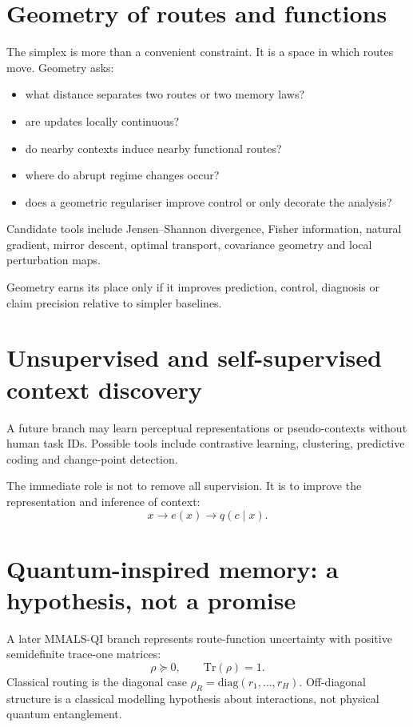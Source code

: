 \documentclass[11pt,a4paper]{article}
\begin{document}
\newpage
\section{Geometry of routes and functions}

The simplex is more than a convenient constraint. It is a space in which routes move. Geometry asks:
\begin{itemize}[leftmargin=1.4em]
\item what distance separates two routes or two memory laws?
\item are updates locally continuous?
\item do nearby contexts induce nearby functional routes?
\item where do abrupt regime changes occur?
\item does a geometric regulariser improve control or only decorate the analysis?
\end{itemize}

Candidate tools include Jensen--Shannon divergence, Fisher information, natural gradient, mirror descent, optimal transport, covariance geometry and local perturbation maps.

\begin{researchbox}
Geometry earns its place only if it improves prediction, control, diagnosis or claim precision relative to simpler baselines.
\end{researchbox}

\section{Unsupervised and self-supervised context discovery}

A future branch may learn perceptual representations or pseudo-contexts without human task IDs. Possible tools include contrastive learning, clustering, predictive coding and change-point detection.

The immediate role is not to remove all supervision. It is to improve the representation and inference of context:
\[
x\rightarrow e(x)\rightarrow q(c\mid x).
\]

\section{Quantum-inspired memory: a hypothesis, not a promise}

A later MMALS-QI branch represents route-function uncertainty with positive semidefinite trace-one matrices:
\[
\rho\succeq0,\qquad \mathrm{Tr}(\rho)=1.
\]
Classical routing is the diagonal case $\rho_R=\mathrm{diag}(r_1,\ldots,r_H)$. Off-diagonal structure is a classical modelling hypothesis about interactions, not physical quantum entanglement.
\end{document}
